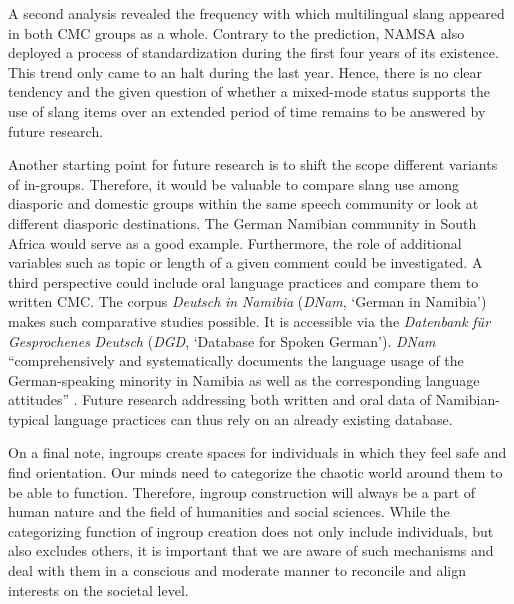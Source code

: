 \documentclass[output=paper]{langsci/langscibook}
\begin{document}
A second analysis revealed the frequency with which multilingual slang appeared in both CMC groups as a whole. Contrary to the prediction, NAMSA also deployed a process of standardization during the first four years of its existence. This trend only came to an halt during the last year. Hence, there is no clear tendency and the given question of whether a mixed-mode status supports the use of slang items over an extended period of time remains to be answered by future research. 

Another starting point for future research is to shift the scope different variants of in-groups. Therefore, it would be valuable to compare slang use among diasporic and domestic groups within the same speech community or look at different diasporic destinations. The German Namibian community in South Africa would serve as a good example. Furthermore, the role of additional variables such as topic or length of a given comment could be investigated. A third perspective could include oral language practices and compare them to written CMC. The corpus \textit{Deutsch} \textit{in} \textit{Namibia} (\textit{DNam}, ‘German in Namibia’) makes such comparative studies possible. It is accessible via the \textit{Datenbank} \textit{für} \textit{Gesprochenes} \textit{Deutsch} (\textit{DGD}, ‘Database for Spoken German’). \textit{DNam} “comprehensively and systematically documents the language usage of the German-speaking minority in Namibia as well as the corresponding language attitudes” \citep{zimmer_korpus_2020}. Future research addressing both written and oral data of Namibian-typical language practices can thus rely on an already existing database.

On a final note, ingroups create spaces for individuals in which they feel safe and find orientation. Our minds need to categorize the chaotic world around them to be able to function. Therefore, ingroup construction will always be a part of human nature and the field of humanities and social sciences. While the categorizing function of ingroup creation does not only include individuals, but also excludes others, it is important that we are aware of such mechanisms and deal with them in a conscious and moderate manner to reconcile and align interests on the societal level.

{\sloppy\printbibliography[heading=subbibliography,notkeyword=this]}
\end{document}
